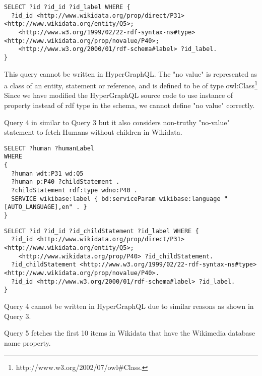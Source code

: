 \begin{minipage}{\linewidth}
\begin{lstlisting}[label=listing:listing40, caption={Query 3 - GraphQL-LD}]
SELECT ?id ?id_id ?id_label WHERE {
  ?id_id <http://www.wikidata.org/prop/direct/P31> <http://www.wikidata.org/entity/Q5>;
    <http://www.w3.org/1999/02/22-rdf-syntax-ns#type> <http://www.wikidata.org/prop/novalue/P40>;
    <http://www.w3.org/2000/01/rdf-schema#label> ?id_label.
}
\end{lstlisting}
\end{minipage}

This query cannot be written in HyperGraphQL. The "no value" is represented as a class of an entity, statement or reference, and is defined to be of type owl:Class\footnote{http://www.w3.org/2002/07/owl\#Class.} Since we have modified the HyperGraphQL source code to use instance of property instead of rdf type in the schema, we cannot define "no value" correctly.


Query 4 in similar to Query 3 but it also considers non-truthy "no-value" statement to fetch Humans without children in Wikidata.

\begin{minipage}{\linewidth}
\begin{lstlisting}[label=listing:listing41, caption={Query 4}]
SELECT ?human ?humanLabel
WHERE
{
  ?human wdt:P31 wd:Q5 
  ?human p:P40 ?childStatement . 
  ?childStatement rdf:type wdno:P40 .
  SERVICE wikibase:label { bd:serviceParam wikibase:language "[AUTO_LANGUAGE],en" . }
}
\end{lstlisting}
\end{minipage}


\begin{minipage}{\linewidth}
\begin{lstlisting}[label=listing:listing42, caption={Query 4 - GraphQL-LD}]
SELECT ?id ?id_id ?id_childStatement ?id_label WHERE {
  ?id_id <http://www.wikidata.org/prop/direct/P31> <http://www.wikidata.org/entity/Q5>;
    <http://www.wikidata.org/prop/P40> ?id_childStatement.
  ?id_childStatement <http://www.w3.org/1999/02/22-rdf-syntax-ns#type> <http://www.wikidata.org/prop/novalue/P40>.
  ?id_id <http://www.w3.org/2000/01/rdf-schema#label> ?id_label.
}
\end{lstlisting}
\end{minipage}

Query 4 cannot be written in HyperGraphQL due to similar reasons as shown in Query 3.


Query 5 fetches the first 10 items in Wikidata that have the Wikimedia database name property.

